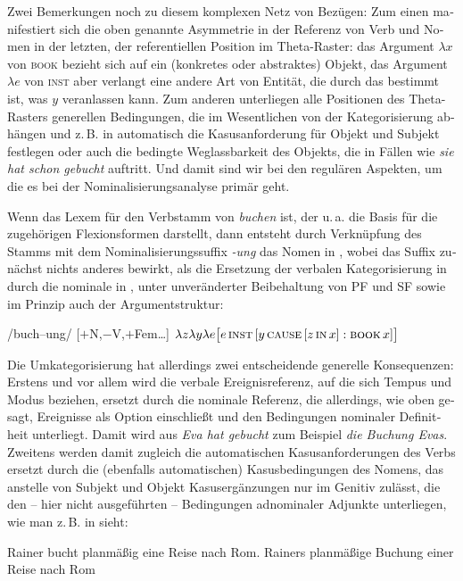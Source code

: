 \documentclass[output=paper,colorlinks,citecolor=brown]{langscibook}
\begin{document}
\begin{otherlanguage}{german}
Zwei Bemerkungen noch zu diesem komplexen Netz von Bezügen: Zum einen manifestiert sich die oben genannte Asymmetrie in der Referenz von Verb und Nomen in der letzten, der referentiellen Position im Theta-Raster: das Argument $\lambda x$ von \textsc{book} bezieht sich auf ein (konkretes oder abstraktes) Objekt, das Argument $\lambda e$ von \textsc{inst} aber verlangt eine andere Art von Entität, die durch das bestimmt ist, was $y$ veranlassen kann. Zum anderen unterliegen alle Positionen des Theta-Rasters generellen Bedingungen, die im Wesentlichen von der Kategorisierung abhängen und z.\,B. in  automatisch die Kasusanforderung für Objekt und Subjekt festlegen oder auch die bedingte Weglassbarkeit des Objekts, die in Fällen wie \textit{sie hat schon gebucht} auftritt. Und damit sind wir bei den regulären Aspekten, um die es bei der Nominalisierungsanalyse primär geht.

Wenn  das Lexem für den Verbstamm von \textit{buchen} ist, der u.\,a. die Basis für die zugehörigen Flexionsformen darstellt, dann entsteht durch Verknüpfung des Stamms mit dem Nominalisierungssuffix \textit{-ung} das Nomen in , wobei das Suffix zunächst nichts anderes bewirkt, als die Ersetzung der verbalen Kategorisierung in  durch die nominale in , unter unveränderter Beibehaltung von PF und SF sowie im Prinzip auch der Argumentstruktur:

\ea /buch--ung/ [$+$N,$-$V,$+$Fem\dots] $\lambda z \lambda y \lambda e \big\lbrack e\, \textsc{inst}\, [y\, \textsc{cause}\, [z\, \textsc{in}\, x] : \textsc{book}\, x ]\big\rbrack$
\label{ex:14}
\z

\noindent Die Umkategorisierung hat allerdings zwei entscheidende generelle Konsequenzen: Erstens und vor allem wird die verbale Ereignisreferenz, auf die sich Tempus und Modus beziehen, ersetzt durch die nominale Referenz, die allerdings, wie oben gesagt, Ereignisse als Option einschließt und den Bedingungen nominaler Definitheit unterliegt. Damit wird aus \textit{Eva hat gebucht} zum Beispiel \textit{die Buchung Evas}. Zweitens werden damit zugleich die automatischen Kasusanforderungen des Verbs ersetzt durch die (ebenfalls automatischen) Kasusbedingungen des Nomens, das anstelle von Subjekt und Objekt Kasusergänzungen nur im Genitiv zulässt, die den -- hier nicht ausgeführten -- Bedingungen adnominaler Adjunkte unterliegen, wie man z.\,B. in  sieht:

\ea 
\ea Rainer bucht planmäßig eine Reise nach Rom.
\ex Rainers planmäßige Buchung einer Reise nach Rom
\z
\label{ex:15}
\z


\end{otherlanguage}
\end{document}
